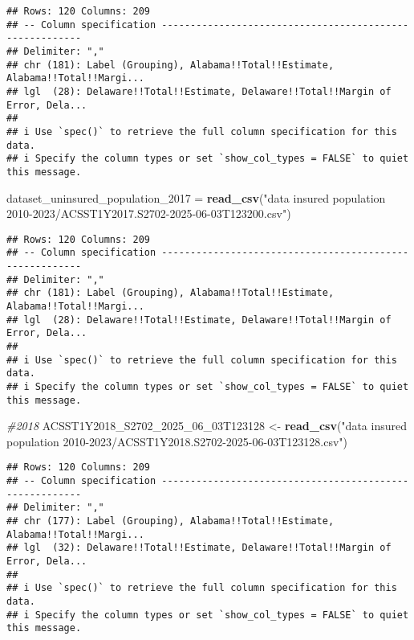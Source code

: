 \documentclass[
]{article}
\newenvironment{Shaded}{\begin{snugshade}}{\end{snugshade}}
\newcommand{\CommentTok}[1]{\textcolor[rgb]{0.56,0.35,0.01}{\textit{#1}}}
\newcommand{\FunctionTok}[1]{\textcolor[rgb]{0.13,0.29,0.53}{\textbf{#1}}}
\newcommand{\NormalTok}[1]{#1}
\newcommand{\OtherTok}[1]{\textcolor[rgb]{0.56,0.35,0.01}{#1}}
\newcommand{\StringTok}[1]{\textcolor[rgb]{0.31,0.60,0.02}{#1}}
\begin{document}
\begin{verbatim}
## Rows: 120 Columns: 209
## -- Column specification --------------------------------------------------------
## Delimiter: ","
## chr (181): Label (Grouping), Alabama!!Total!!Estimate, Alabama!!Total!!Margi...
## lgl  (28): Delaware!!Total!!Estimate, Delaware!!Total!!Margin of Error, Dela...
## 
## i Use `spec()` to retrieve the full column specification for this data.
## i Specify the column types or set `show_col_types = FALSE` to quiet this message.
\end{verbatim}

\begin{Shaded}
\begin{Highlighting}[]
\NormalTok{dataset\_uninsured\_population\_2017 }\OtherTok{=} \FunctionTok{read\_csv}\NormalTok{(}\StringTok{"data insured population 2010{-}2023/ACSST1Y2017.S2702{-}2025{-}06{-}03T123200.csv"}\NormalTok{)}
\end{Highlighting}
\end{Shaded}

\begin{verbatim}
## Rows: 120 Columns: 209
## -- Column specification --------------------------------------------------------
## Delimiter: ","
## chr (181): Label (Grouping), Alabama!!Total!!Estimate, Alabama!!Total!!Margi...
## lgl  (28): Delaware!!Total!!Estimate, Delaware!!Total!!Margin of Error, Dela...
## 
## i Use `spec()` to retrieve the full column specification for this data.
## i Specify the column types or set `show_col_types = FALSE` to quiet this message.
\end{verbatim}

\begin{Shaded}
\begin{Highlighting}[]
\CommentTok{\#2018}
\NormalTok{ACSST1Y2018\_S2702\_2025\_06\_03T123128 }\OtherTok{\textless{}{-}} \FunctionTok{read\_csv}\NormalTok{(}\StringTok{"data insured population 2010{-}2023/ACSST1Y2018.S2702{-}2025{-}06{-}03T123128.csv"}\NormalTok{)}
\end{Highlighting}
\end{Shaded}

\begin{verbatim}
## Rows: 120 Columns: 209
## -- Column specification --------------------------------------------------------
## Delimiter: ","
## chr (177): Label (Grouping), Alabama!!Total!!Estimate, Alabama!!Total!!Margi...
## lgl  (32): Delaware!!Total!!Estimate, Delaware!!Total!!Margin of Error, Dela...
## 
## i Use `spec()` to retrieve the full column specification for this data.
## i Specify the column types or set `show_col_types = FALSE` to quiet this message.
\end{verbatim}
\end{document}
